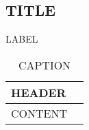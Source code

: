 \subsection{TITLE} LABEL

\begin{center}
    \begin{longtable}{ | >{\centering\arraybackslash}m{5cm} | >{\centering\arraybackslash}m{5cm} | }
        
        \hline
        HEADER \\ \hline
        \endhead
        
CONTENT

       	\caption[TITLE]{CAPTION}
	\end{longtable}
	
\end{center}
